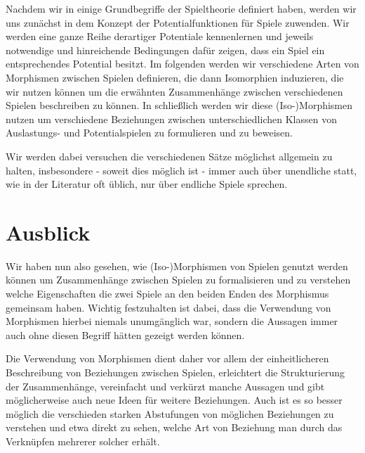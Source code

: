 \documentclass[a4paper,ngerman,11pt,bibliography=totoc]{scrartcl}
\theoremstyle{definition}
\theoremstyle{plain}
\theoremstyle{remark}
\begin{document}
Nachdem wir in  einige Grundbegriffe der Spieltheorie definiert haben, werden wir uns zunächst in  dem Konzept der Potentialfunktionen für Spiele zuwenden. Wir werden eine ganze Reihe derartiger Potentiale kennenlernen und jeweils notwendige und hinreichende Bedingungen dafür zeigen, dass ein Spiel ein entsprechendes Potential besitzt. Im folgenden  werden wir verschiedene Arten von Morphismen zwischen Spielen definieren, die dann Isomorphien induzieren, die wir nutzen können um die erwähnten Zusammenhänge zwischen verschiedenen Spielen beschreiben zu können. In  schließlich werden wir diese (Iso-)Morphismen nutzen um verschiedene Beziehungen zwischen unterschiedlichen Klassen von Auslastungs- und Potentialspielen zu formulieren und zu beweisen.

Wir werden dabei versuchen die verschiedenen Sätze möglichst allgemein zu halten, insbesondere - soweit dies möglich ist - immer auch über unendliche statt, wie in der Literatur oft üblich, nur über endliche Spiele sprechen.






{}
\section*{Ausblick}

Wir haben nun also gesehen, wie (Iso-)Morphismen von Spielen genutzt werden können um Zusammenhänge zwischen Spielen zu formalisieren und zu verstehen welche Eigenschaften die zwei Spiele an den beiden Enden des Morphismus gemeinsam haben. Wichtig festzuhalten ist dabei, dass die Verwendung von Morphismen hierbei niemals unumgänglich war, sondern die Aussagen immer auch ohne diesen Begriff hätten gezeigt werden können. 

Die Verwendung von Morphismen dient daher vor allem der einheitlicheren Beschreibung von Beziehungen zwischen Spielen, erleichtert die Strukturierung der Zusammenhänge, vereinfacht und verkürzt manche Aussagen und gibt möglicherweise auch neue Ideen für weitere Beziehungen. Auch ist es so besser möglich die verschieden starken Abstufungen von möglichen Beziehungen zu verstehen und etwa direkt zu sehen, welche Art von Beziehung man durch das Verknüpfen mehrerer solcher erhält.



\newpage
\nocite{*}
\printbibliography
\end{document}
